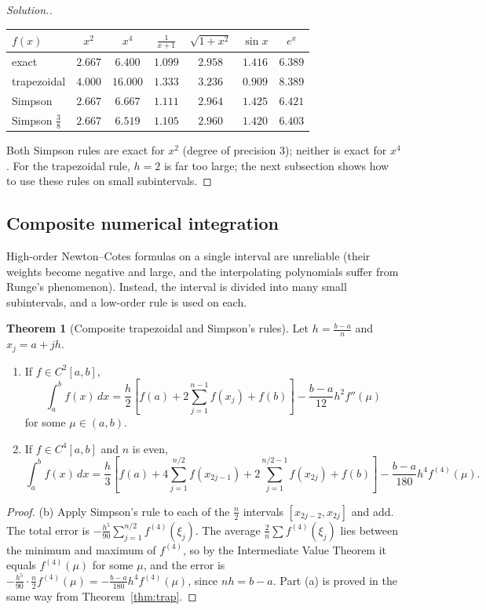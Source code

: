 \documentclass[11pt,a4paper]{article}
\numberwithin{equation}{section}
\theoremstyle{definition}
\newtheorem{thm}{Theorem}[subsection]
\newenvironment{solution}
  {\renewcommand{\qedsymbol}{}\begin{proof}[\textit{Solution}.]}
  {\end{proof}}
\begin{document}
\begin{solution}
\begin{center}
\begin{tabular}{lcccccc}
\hline
$f(x)$ & $x^2$ & $x^4$ & $\frac1{x+1}$ & $\sqrt{1+x^2}$ & $\sin x$ & $e^x$\\
\hline
exact & $2.667$ & $6.400$ & $1.099$ & $2.958$ & $1.416$ & $6.389$\\
trapezoidal & $4.000$ & $16.000$ & $1.333$ & $3.236$ & $0.909$ & $8.389$\\
Simpson & $2.667$ & $6.667$ & $1.111$ & $2.964$ & $1.425$ & $6.421$\\
Simpson $\frac38$ & $2.667$ & $6.519$ & $1.105$ & $2.960$ & $1.420$ & $6.403$\\
\hline
\end{tabular}
\end{center}
Both Simpson rules are exact for $x^2$ (degree of precision $3$); neither is exact for $x^4$. For the trapezoidal rule, $h = 2$ is far too
large; the next subsection shows how to use these rules on small subintervals.
\end{solution}


\subsection{Composite numerical integration}
\label{sec:composite}

High-order Newton--Cotes formulas on a single interval are unreliable (their weights become negative and large, and the
interpolating polynomials suffer from Runge's phenomenon). Instead, the interval is divided into many small subintervals, and a low-order
rule is used on each.

\begin{thm}[Composite trapezoidal and Simpson's rules]
\label{thm:composite}
Let $h = \frac{b-a}{n}$ and $x_j = a+jh$.
\begin{enumerate}
\item[(a)] If $f\in C^2[a,b]$,
$$\int_a^bf(x)\,dx = \frac h2\left[f(a)+2\sum_{j=1}^{n-1}f(x_j)+f(b)\right]-\frac{b-a}{12}h^2f''(\mu)$$
for some $\mu\in(a,b)$.
\item[(b)] If $f\in C^4[a,b]$ and $n$ is even,
$$\int_a^bf(x)\,dx = \frac h3\left[f(a)+4\sum_{j=1}^{n/2}f(x_{2j-1})+2\sum_{j=1}^{n/2-1}f(x_{2j})+f(b)\right]-\frac{b-a}{180}h^4f^{(4)}(\mu).$$
\end{enumerate}
\end{thm}

\begin{proof}
(b) Apply Simpson's rule to each of the $\frac n2$ intervals $[x_{2j-2},x_{2j}]$ and add. The total error is
$-\frac{h^5}{90}\sum_{j=1}^{n/2}f^{(4)}(\xi_j)$. The average $\frac{2}{n}\sum f^{(4)}(\xi_j)$ lies between the minimum and maximum of $f^{(4)}$, so by the
Intermediate Value Theorem it equals $f^{(4)}(\mu)$ for some $\mu$, and the error is $-\frac{h^5}{90}\cdot\frac n2f^{(4)}(\mu) = -\frac{b-a}{180}h^4f^{(4)}(\mu)$,
since $nh = b-a$. Part (a) is proved in the same way from Theorem~\ref{thm:trap}.
\end{proof}
\end{document}
